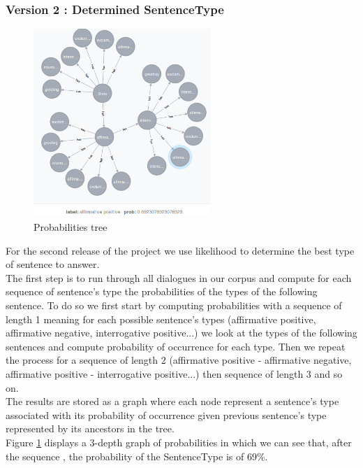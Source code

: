\subsubsection{Version 2 : Determined SentenceType}
\label{sssec:v_stype}
\begin{figure}[!h]
\begin{center}
\includegraphics[width=0.6\textwidth]{./img/stats.png}
\end{center}
\caption{Probabilities tree}
\label{fig:stats}
\end{figure}
For the second release of the project we use likelihood to determine the best type of sentence to answer.\\
The first step is to run through all dialogues in our corpus and compute for each sequence of sentence's type the probabilities of the types of the following sentence. To do so we first start by computing probabilities with a sequence of length 1 meaning for each possible sentence's types (affirmative positive, affirmative negative, interrogative positive...) we look at the types of the following sentences and compute probability of occurrence for each type. Then we repeat the process for a sequence of length 2 (affirmative positive - affirmative negative, affirmative positive - interrogative positive...) then sequence of length 3 and so on.\\
The results are stored as a graph where each node represent a sentence's type associated with its probability of occurrence given previous sentence's type represented by its ancestors in the tree.\\
Figure \ref{fig:stats} displays a 3-depth graph of probabilities in which we can see that, after the sequence , the probability of the SentenceType  is of 69\%.\\
